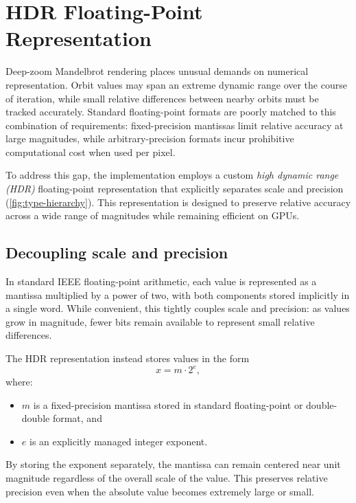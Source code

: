 \section{HDR Floating-Point Representation}
\label{sec:hdr-float}

Deep-zoom Mandelbrot rendering places unusual demands on numerical
representation. Orbit values may span an extreme dynamic range over the course
of iteration, while small relative differences between nearby orbits must be
tracked accurately. Standard floating-point formats are poorly matched to this
combination of requirements: fixed-precision mantissas limit relative accuracy
at large magnitudes, while arbitrary-precision formats incur prohibitive
computational cost when used per pixel.

To address this gap, the implementation employs a custom \emph{high dynamic range (HDR)}
floating-point representation that explicitly separates scale and precision
(\cref{fig:type-hierarchy}).
This representation is designed to preserve relative accuracy across a wide
range of magnitudes while remaining efficient on GPUs.

\subsection{Decoupling scale and precision}

In standard IEEE floating-point arithmetic, each value is represented as a
mantissa multiplied by a power of two, with both components stored implicitly in
a single word. While convenient, this tightly couples scale and precision: as
values grow in magnitude, fewer bits remain available to represent small
relative differences.

The HDR representation instead stores values in the form
\begin{equation}
x = m \cdot 2^{e},
\end{equation}
where:
\begin{itemize}
\item \(m\) is a fixed-precision mantissa stored in standard floating-point or
      double-double format, and
\item \(e\) is an explicitly managed integer exponent.
\end{itemize}

By storing the exponent separately, the mantissa can remain centered near unit
magnitude regardless of the overall scale of the value. This preserves relative
precision even when the absolute value becomes extremely large or small.

